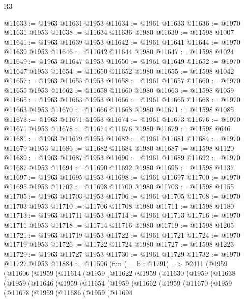 \begin{lexlean}{R3}
\begin{coremodule}
@11633 := @1963 @11631 @1953
@11634 := @1961 @11633
@11636 := @1970 @11631 @1953
@11638 := @11634 @11636 @1980
@11639 := @11598 @1007
@11641 := @1963 @11639 @1953
@11642 := @1961 @11641
@11644 := @1970 @11639 @1953
@11646 := @11642 @11644 @1980
@11647 := @11598 @1024
@11649 := @1963 @11647 @1953
@11650 := @1961 @11649
@11652 := @1970 @11647 @1953
@11654 := @11650 @11652 @1980
@11655 := @11598 @1042
@11657 := @1963 @11655 @1953
@11658 := @1961 @11657
@11660 := @1970 @11655 @1953
@11662 := @11658 @11660 @1980
@11663 := @11598 @1059
@11665 := @1963 @11663 @1953
@11666 := @1961 @11665
@11668 := @1970 @11663 @1953
@11670 := @11666 @11668 @1980
@11671 := @11598 @1085
@11673 := @1963 @11671 @1953
@11674 := @1961 @11673
@11676 := @1970 @11671 @1953
@11678 := @11674 @11676 @1980
@11679 := @11598 @646
@11681 := @1963 @11679 @1953
@11682 := @1961 @11681
@11684 := @1970 @11679 @1953
@11686 := @11682 @11684 @1980
@11687 := @11598 @1120
@11689 := @1963 @11687 @1953
@11690 := @1961 @11689
@11692 := @1970 @11687 @1953
@11694 := @11690 @11692 @1980
@11695 := @11598 @1137
@11697 := @1963 @11695 @1953
@11698 := @1961 @11697
@11700 := @1970 @11695 @1953
@11702 := @11698 @11700 @1980
@11703 := @11598 @1155
@11705 := @1963 @11703 @1953
@11706 := @1961 @11705
@11708 := @1970 @11703 @1953
@11710 := @11706 @11708 @1980
@11711 := @11598 @1180
@11713 := @1963 @11711 @1953
@11714 := @1961 @11713
@11716 := @1970 @11711 @1953
@11718 := @11714 @11716 @1980
@11719 := @11598 @1205
@11721 := @1963 @11719 @1953
@11722 := @1961 @11721
@11724 := @1970 @11719 @1953
@11726 := @11722 @11724 @1980
@11727 := @11598 @1223
@11729 := @1963 @11727 @1953
@11730 := @1961 @11729
@11732 := @1970 @11727 @1953
@11884 := @11596
    (fun (__b : @1791) =>
    @2411
      (@1959
        (@11606
          (@1959
            (@11614
              (@1959
                (@11622
                  (@1959
                    (@11630
                      (@1959
                        (@11638
                          (@1959
                            (@11646
                              (@1959
                                (@11654
                                  (@1959
                                    (@11662
                                      (@1959
                                        (@11670
                                          (@1959
                                            (@11678
                                              (@1959
                                                (@11686
                                                  (@1959
                                                    (@11694

\end{coremodule}
\end{lexlean}
